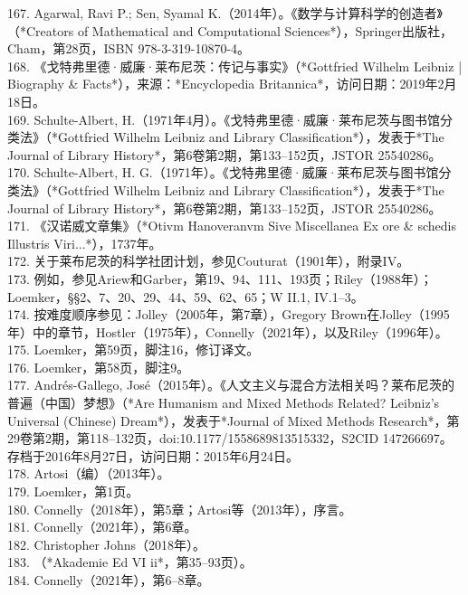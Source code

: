 167. Agarwal, Ravi P.; Sen, Syamal K.（2014年）。《数学与计算科学的创造者》（*Creators of Mathematical and Computational Sciences*），Springer出版社，Cham，第28页，ISBN 978-3-319-10870-4。\\
168. 《戈特弗里德·威廉·莱布尼茨：传记与事实》（*Gottfried Wilhelm Leibniz | Biography & Facts*），来源：*Encyclopedia Britannica*，访问日期：2019年2月18日。\\ 
169. Schulte-Albert, H.（1971年4月）。《戈特弗里德·威廉·莱布尼茨与图书馆分类法》（*Gottfried Wilhelm Leibniz and Library Classification*），发表于*The Journal of Library History*，第6卷第2期，第133–152页，JSTOR 25540286。\\
170. Schulte-Albert, H. G.（1971年）。《戈特弗里德·威廉·莱布尼茨与图书馆分类法》（*Gottfried Wilhelm Leibniz and Library Classification*），发表于*The Journal of Library History*，第6卷第2期，第133–152页，JSTOR 25540286。\\
171. 《汉诺威文章集》（*Otivm Hanoveranvm Sive Miscellanea Ex ore & schedis Illustris Viri...*），1737年。\\
172. 关于莱布尼茨的科学社团计划，参见Couturat（1901年），附录IV。\\
173. 例如，参见Ariew和Garber，第19、94、111、193页；Riley（1988年）；Loemker，§§2、7、20、29、44、59、62、65；W II.1, IV.1–3。\\
174. 按难度顺序参见：Jolley（2005年，第7章），Gregory Brown在Jolley（1995年）中的章节，Hostler（1975年），Connelly（2021年），以及Riley（1996年）。\\
175. Loemker，第59页，脚注16，修订译文。\\
176. Loemker，第58页，脚注9。\\
177. Andrés-Gallego, José（2015年）。《人文主义与混合方法相关吗？莱布尼茨的普遍（中国）梦想》（*Are Humanism and Mixed Methods Related? Leibniz’s Universal (Chinese) Dream*），发表于*Journal of Mixed Methods Research*，第29卷第2期，第118–132页，doi:10.1177/1558689813515332，S2CID 147266697。存档于2016年8月27日，访问日期：2015年6月24日。\\
178. Artosi（编）（2013年）。\\
179. Loemker，第1页。\\
180. Connelly（2018年），第5章；Artosi等（2013年），序言。\\
181. Connelly（2021年），第6章。\\
182. Christopher Johns（2018年）。\\
183. （*Akademie Ed VI ii*，第35–93页）。\\
184. Connelly（2021年），第6–8章。\\
